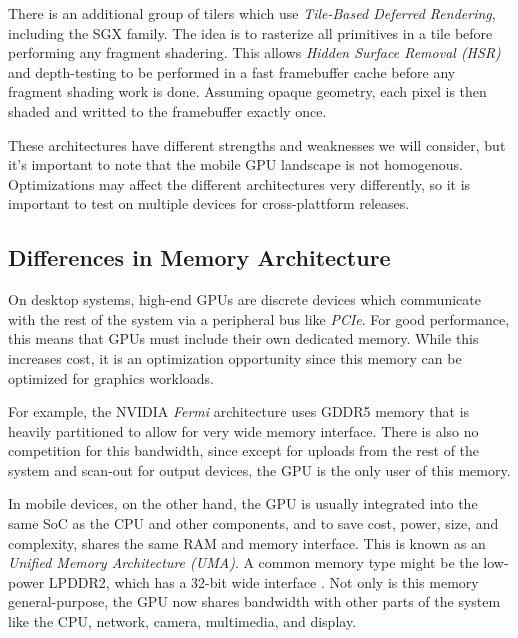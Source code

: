  There is an additional group of tilers
which use \textit{Tile-Based Deferred Rendering}, including the SGX family.
The idea is to rasterize all primitives in a tile before performing any
fragment shadering.  This allows \textit{Hidden Surface Removal (HSR)} and
depth-testing to be performed in a fast framebuffer cache before any fragment
shading work is done.  Assuming opaque geometry, each pixel is then shaded and
writted to the framebuffer exactly once.

These architectures have different strengths and weaknesses we will consider,
but it's important to note that the mobile GPU landscape is not homogenous.
Optimizations may affect the different architectures very differently, so it is
important to test on multiple devices for cross-plattform releases.
\subsection{Differences in Memory
Architecture}\label{Jon-McCaffrey:differences-in-memory-architecture}

On desktop systems, high-end GPUs are discrete devices which communicate with
the rest of the system via a peripheral bus like \textit{PCIe}.  For good
performance, this means that GPUs must include their own dedicated memory.
While this increases cost, it is an optimization opportunity since this memory
can be optimized for graphics workloads.

For example, the NVIDIA \textit{Fermi} architecture uses GDDR5 memory that is
heavily partitioned \cite{Walton10} to allow for very wide memory interface.
There is also no competition for this bandwidth, since except for uploads from
the rest of the system and scan-out for output devices, the GPU is the only
user of this memory.

 

In mobile devices, on the other hand, the GPU is usually integrated into the
same SoC as the CPU and other components, and to save cost, power, size, and
complexity, shares the same RAM and memory interface.  This is known as an
\textit{Unified Memory Architecture (UMA)}.  A common memory type might be the
low-power LPDDR2, which has a 32-bit wide interface
\cite{Klug11b}.  Not only is this memory general-purpose, the GPU
now shares bandwidth with other parts of the system like the CPU, network,
camera, multimedia, and display.   


